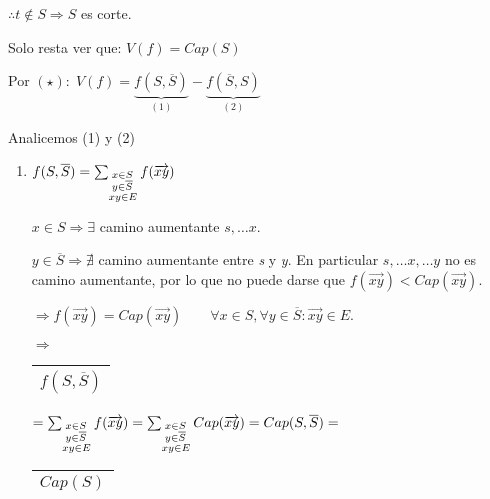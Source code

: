 \documentclass[12pt,a4paper]{report}
\begin{document}
				$\therefore t \notin S \Rightarrow S$ es corte.

				\begin{center}
					Solo resta ver que: $V(f) = Cap(S)$
				\end{center}

				Por $(\star): \; V(f) =  \underbrace{f(S, \overline{S})}_{(1)} - \underbrace{f(\overline{S}, S)}_{(2)}$

				\vspace{2mm}
				Analicemos (1) y (2)
			\begin{enumerate}[(1)]
				\item $f(S, \overline{S}) = \sum_{\begin{subarray}{l} \; x \in S\\
\; y \in \overline{S} \\ xy \in E\end{subarray}} f(\overrightarrow{xy}) $

				$x \in S \Rightarrow \exists$ camino aumentante $ s, \dotsc x$.

				$y \in \overline{S} \Rightarrow \nexists$ camino aumentante entre \textit{s} y \textit{y}. En particular $s, 	\dotsc x, \dotsc y$ no es camino aumentante, por lo que no puede darse que $f(\overrightarrow{xy}) < Cap(\overrightarrow{xy})$.

				\vspace{3mm}
				$\Rightarrow f(\overrightarrow{xy}) = Cap(\overrightarrow{xy}) \qquad \forall x \in S, \forall y \in \overline{S} : \overrightarrow{xy} \in E.$

				\vspace{3mm}
				$\Rightarrow$ \begin{tabular}{|c|} \hline $f(S, \overline{S})$ \\ \hline \end{tabular} $= \sum_{\begin{subarray}{l} \; x \in S\\  \; y \in \overline{S} \\ xy \in E\end{subarray}} f(\overrightarrow{xy}) = \sum_{\begin{subarray}{l} \; x \in S\\  \; y \in \overline{S} \\ xy \in E\end{subarray}} Cap(\overrightarrow{xy}) = Cap(S, \overline{S}) =$ \begin{tabular}{|c|} \hline $ Cap(S) $ \\ \hline \end{tabular}


\end{enumerate}
\end{document}
